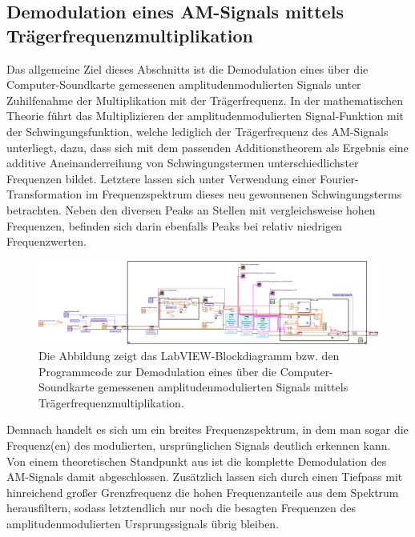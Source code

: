 \documentclass[
a4paper,
12pt,
pagesize,
ngerman
]{scrartcl}
\begin{document}

	
	\subsection{Demodulation eines AM-Signals mittels Trägerfrequenzmultiplikation} \label{DemodTraeger}
	Das allgemeine Ziel dieses Abschnitts ist die Demodulation eines über die Computer-Soundkarte gemessenen amplitudenmodulierten Signals unter Zuhilfenahme der Multiplikation mit der Trägerfrequenz. 
	In der mathematischen Theorie führt das Multiplizieren der amplitudenmodulierten Signal-Funktion mit der Schwingungsfunktion, welche lediglich der Trägerfrequenz des AM-Signals unterliegt, dazu, dass sich mit dem passenden Additionstheorem als Ergebnis eine additive Aneinanderreihung von Schwingungstermen unterschiedlichster Frequenzen bildet. 
	Letztere lassen sich unter Verwendung einer Fourier-Transformation im Frequenzspektrum dieses neu gewonnenen Schwingungsterms betrachten. 
	Neben den diversen Peaks an Stellen mit vergleichsweise hohen Frequenzen, befinden sich darin ebenfalls Peaks bei relativ niedrigen Frequenzwerten.
		
	\begin{figure}[H]
		\centering
		\includegraphics[width=1.0\textwidth]{EIRE2018Dateien/Tag4/traegerMultOszi/Oszilloskop__modifiziertd}
		\caption{Die Abbildung zeigt das LabVIEW-Blockdiagramm bzw. den Programmcode zur Demodulation eines über die Computer-Soundkarte gemessenen amplitudenmodulierten Signals mittels Trägerfrequenzmultiplikation.}
		\label{MultiTraegerProgrammcode}
	\end{figure}

	\noindent Demnach handelt es sich um ein breites Frequenzspektrum, in dem man sogar die Frequenz(en) des modulierten, ursprünglichen Signals deutlich erkennen kann. 
	Von einem theoretischen Standpunkt aus ist die komplette Demodulation des AM-Signals damit abgeschlossen. 
	Zusätzlich lassen sich durch einen Tiefpass mit hinreichend großer Grenzfrequenz die hohen Frequenzanteile aus dem Spektrum herausfiltern, sodass letztendlich nur noch die besagten Frequenzen des amplitudenmodulierten Ursprungssignals übrig bleiben. 
	
\end{document}
